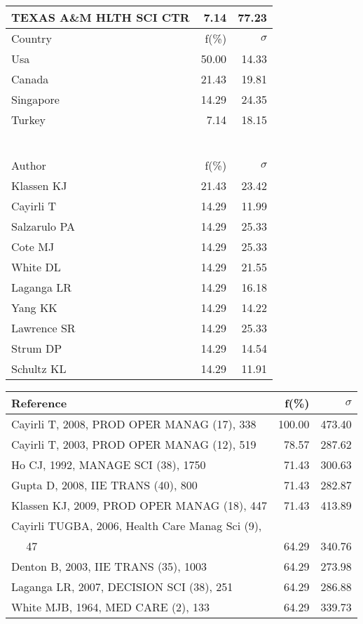 \documentclass[a4paper,11pt]{report}
\begin{document}
\begin{landscape}
\begin{table}[!ht]
{\begin{tabular}{|l r r|}
TEXAS A\&M HLTH SCI CTR & 7.14 & 77.23\\
\hline
\hline
Country & f(\%) & $\sigma$\\
\hline
Usa & 50.00 & 14.33\\
Canada & 21.43 & 19.81\\
Singapore & 14.29 & 24.35\\
Turkey & 7.14 & 18.15\\
 &  & \\
 &  & \\
 &  & \\
 &  & \\
 &  & \\
 &  & \\
\hline
\hline
Author & f(\%) & $\sigma$\\
\hline
Klassen KJ & 21.43 & 23.42\\
Cayirli T & 14.29 & 11.99\\
Salzarulo PA & 14.29 & 25.33\\
Cote MJ & 14.29 & 25.33\\
White DL & 14.29 & 21.55\\
Laganga LR & 14.29 & 16.18\\
Yang KK & 14.29 & 14.22\\
Lawrence SR & 14.29 & 25.33\\
Strum DP & 14.29 & 14.54\\
Schultz KL & 14.29 & 11.91\\
\hline
\end{tabular}
}
{\scriptsize\begin{tabular}{|l r r|}
\hline
Reference & f(\%) & $\sigma$\\
\hline
Cayirli T, 2008, PROD OPER MANAG (17), 338 & 100.00 & 473.40\\
Cayirli T, 2003, PROD OPER MANAG (12), 519 & 78.57 & 287.62\\
Ho CJ, 1992, MANAGE SCI (38), 1750 & 71.43 & 300.63\\
Gupta D, 2008, IIE TRANS (40), 800 & 71.43 & 282.87\\
Klassen KJ, 2009, PROD OPER MANAG (18), 447 & 71.43 & 413.89\\
Cayirli TUGBA, 2006, Health Care Manag Sci (9), &  & \\
$\quad$ 47 & 64.29 & 340.76\\
Denton B, 2003, IIE TRANS (35), 1003 & 64.29 & 273.98\\
Laganga LR, 2007, DECISION SCI (38), 251 & 64.29 & 286.88\\
White MJB, 1964, MED CARE (2), 133 & 64.29 & 339.73\\

\end{tabular}}
\end{table}
\end{landscape}
\end{document}
